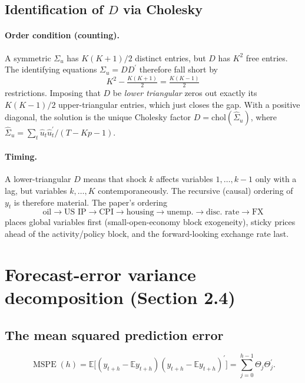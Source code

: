\documentclass[11pt]{article}
\newcommand{\E}{\mathbb{E}}
\newcommand{\tp}{^{\prime}}
\DeclareMathOperator{\MSPE}{MSPE}
\theoremstyle{remark}
\begin{document}
\subsection*{Identification of $D$ via Cholesky}
\paragraph{Order condition (counting).} A symmetric $\Sigma_u$ has
$K(K+1)/2$ distinct entries, but $D$ has $K^2$ free entries. The identifying
equations $\Sigma_u=DD\tp$ therefore fall short by
\[
K^2-\tfrac{K(K+1)}{2}=\tfrac{K(K-1)}{2}
\]
restrictions. Imposing that $D$ be \emph{lower triangular} zeros out exactly its
$K(K-1)/2$ upper-triangular entries, which just closes the gap. With a positive
diagonal, the solution is the unique Cholesky factor $D=\mathrm{chol}(\hat\Sigma_u)$,
where $\hat\Sigma_u=\sum_{t}\hat u_t\hat u_t\tp/(T-Kp-1)$.

\paragraph{Timing.} A lower-triangular $D$ means that shock
$k$ affects variables $1,\dots,k-1$ only with a lag, but variables
$k,\dots,K$ contemporaneously. The recursive (causal) ordering of $y_t$ is
therefore material. The paper's ordering
\[
\text{oil}\to\text{US IP}\to\text{CPI}\to\text{housing}\to\text{unemp.}\to\text{disc.\ rate}\to\text{FX}
\]
places global variables first (small-open-economy block exogeneity), sticky
prices ahead of the activity/policy block, and the forward-looking exchange rate
last.

\section{Forecast-error variance decomposition (Section 2.4)}
\subsection*{The mean squared prediction error}
\begin{equation}
\MSPE(h)=\E\big[(y_{t+h}-\E y_{t+h})(y_{t+h}-\E y_{t+h})\tp\big]
=\sum_{j=0}^{h-1}\Theta_j\Theta_j\tp. \tag{7$'$}
\end{equation}
\end{document}
